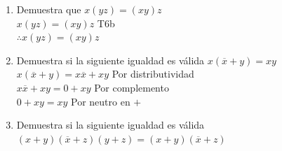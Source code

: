\documentclass[a4paper,12pt]{article}
\begin{document}
\begin{enumerate}[label=\textcolor{teal}{\textbf{\arabic*.}}]
    \item Demuestra que $x(yz)=(xy)z$ \\
    
        $x(yz)=(xy)z$ T6b\\ 
        $\therefore x(yz)=(xy)z$  \\
    \item Demuestra si la siguiente igualdad es válida $x(\overline{x}+y)=xy$\\
    $x(\overline{x}+y)=x\overline{x}+xy$ \hspace{1cm} Por distributividad\\
    \hfill{$x\overline{x}+xy$}$=0+xy$ \hspace{1.5cm} Por complemento\\
    \hfill{$0+xy$}$=xy$  \hspace{2.5cm} Por neutro en $+$\\ 
        
            


    \item  Demuestra si la siguiente igualdad es válida $(x+y)(\overline{x}+z)(y+z)=(x+y)(\overline{x}+z)$\\
    

\end{enumerate}
\end{document}
